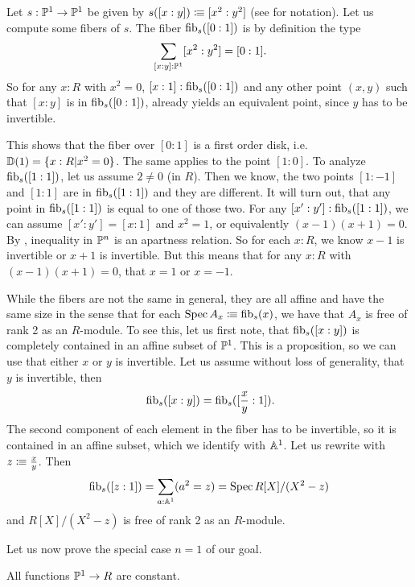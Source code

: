 \begin{example}
  Let $s:\mathbb{P}^1\to \mathbb{P}^1$ be given by $s([x:y])\vcentcolon\mspace{-1.2mu}\equiv [x^2:y^2]$
  (see  for notation).
  Let us compute some fibers of $s$. The fiber $\mathrm{fib}_s([0:1])$ is
  by definition the type
  \[
    \sum_{[x:y]:\bP^1}[x^2:y^2]=[0:1]\rlap{.}
  \]
  So for any $x:R$ with $x^2=0$, $[x:1]:\mathrm{fib}_s([0:1])$  and
  any other point $(x,y)$ such that $[x:y]$ is in $\mathrm{fib}_s([0:1])$,
  already yields an equivalent point, since $y$ has to be invertible.

  This shows that the fiber over $[0:1]$ is a first order disk, i.e. $\mathbb{D}(1)=\{x:R|x^2=0\}$.
  The same applies to the point $[1:0]$.
  To analyze $\mathrm{fib}_s([1:1])$, let us assume $2\neq 0$ (in $R$).
  Then we know, the two points $[1:-1]$ and $[1:1]$ are in $\mathrm{fib}_s([1:1])$ and they are different.
  It will turn out, that any point in $\mathrm{fib}_s([1:1])$ is equal to one of those two.
  For any $[x':y']:\mathrm{fib}_s([1:1])$, we can assume $[x':y']=[x:1]$ and $x^2=1$, or equivalently $(x-1)(x+1)=0$.
  By , inequality in $\mathbb{P}^n$ is an apartness relation.
  So for each $x:R$, we know $x-1$ is invertible or $x+1$ is invertible.
  But this means that for any $x:R$ with $(x-1)(x+1)=0$, that $x=1$ or $x=-1$.

  While the fibers are not the same in general,
  they are all affine and have the same size in the sense that for each $\operatorname{Spec} A_x\vcentcolon\mspace{-1.2mu}\equiv \mathrm{fib}_s(x)$,
  we have that $A_x$ is free of rank 2 as an $R$-module.
  To see this, let us first note,
  that $\mathrm{fib}_s([x:y])$ is completely contained in an affine subset of $\mathbb{P}^1$.
  This is a proposition, so we can use that either $x$ or $y$ is invertible.
  Let us assume without loss of generality, that $y$ is invertible,
  then
  \[
    \fib_s([x:y])=\fib_s([\frac{x}{y}:1])
    \rlap{.}
  \]
  The second component of each element in the fiber has to be invertible,
  so it is contained in an affine subset, which we identify with $\mathbb{A}^1$.
  Let us rewrite with $z\vcentcolon\mspace{-1.2mu}\equiv \frac{x}{y}$.
  Then
  \[
    \mathrm{fib}_s([z:1])=\sum_{a:\mathbb{A}^1}(a^2=z)=\operatorname{Spec} R[X]/(X^2-z)
  \]
  and $R[X]/(X^2-z)$ is free of rank 2 as an $R$-module.
\end{example}

Let us now prove the special case $n = 1$ of our goal.

\begin{lemma}%
  \label{functions-on-projective-line-constant}
  All functions $\mathbb{P}^1 \to R$ are constant.
\end{lemma}

